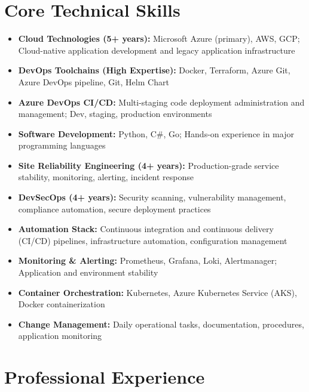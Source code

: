 \documentclass[11pt,a4paper]{article}
\begin{document}
\section*{Core Technical Skills}
\begin{itemize}[noitemsep]
\item \textbf{Cloud Technologies (5+ years):} Microsoft Azure (primary), AWS, GCP; Cloud-native application development and legacy application infrastructure
\item \textbf{DevOps Toolchains (High Expertise):} Docker, Terraform, Azure Git, Azure DevOps pipeline, Git, Helm Chart
\item \textbf{Azure DevOps CI/CD:} Multi-staging code deployment administration and management; Dev, staging, production environments
\item \textbf{Software Development:} Python, C\#, Go; Hands-on experience in major programming languages
\item \textbf{Site Reliability Engineering (4+ years):} Production-grade service stability, monitoring, alerting, incident response
\item \textbf{DevSecOps (4+ years):} Security scanning, vulnerability management, compliance automation, secure deployment practices
\item \textbf{Automation Stack:} Continuous integration and continuous delivery (CI/CD) pipelines, infrastructure automation, configuration management
\item \textbf{Monitoring \& Alerting:} Prometheus, Grafana, Loki, Alertmanager; Application and environment stability
\item \textbf{Container Orchestration:} Kubernetes, Azure Kubernetes Service (AKS), Docker containerization
\item \textbf{Change Management:} Daily operational tasks, documentation, procedures, application monitoring
\end{itemize}

\section*{Professional Experience}
\end{document}
